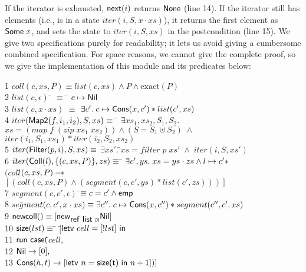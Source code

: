 \documentclass[preprint,natbib]{sigplanconf}
\begin{document}
If the iterator is exhausted, $\mbox{\textsf{{next}}}(i)$ returns $\mbox{\textsf{{None}}}$
(line 14). If the iterator still has elements (i.e., is in a state
$iter(i, S, x\cdot xs)$), it returns the first element as
$\mbox{\textsf{{Some}}}\;x$, and sets the state to $iter(i, S, xs)$ in the
postcondition (line 15). We give two specifications purely for
readability; it lets us avoid giving a cumbersome combined
specification.
%
For space reasons, we cannot give the complete proof, so we give the
implementation of this module and its predicates below:
{\small
\begin{tabbing}
1\qquad \= $coll$\=$(c, xs, P) \equiv list(c, xs) \land P \land \mbox{exact}(P)$ \\[0.5em]
2 \> $list(c, \epsilon)$ \qquad\= $\equiv$ \= $c \mapsto \mbox{\textsf{{Nil}}}$ \\
3 \> $list(c, x\cdot xs)$ \> $\equiv$ \> 
   $\exists c'.\; c \mapsto \mbox{\textsf{{Cons}}}(x, c') * list(c', xs)$ 
\\[0.5em]
4 \> $iter$\=$(\mbox{\textsf{{Map2}}}(f, i_1, i_2), S, xs)$\=$ \equiv$ \= 
         $\exists$\=$xs_1, xs_2, S_1, S_2.$ \\
\> \>\>\>\>$xs = (map\; f\; (zip\; xs_1\; xs_2)) \land (S = S_1 \uplus S_2) \;\land$\\
\> \>\>\>\>$iter(i_1, S_1, xs_1) * iter(i_2, S_2, xs_2)$ \\
5 \> $iter(\mbox{\textsf{{Filter}}}(p, i), S, xs) \equiv$ 
   $\exists xs'.\;$\=$xs = filter\;p\;xs' \;\land\; iter(i, S, xs')$ \\
6 \> $iter(\mbox{\textsf{{Coll}}}(l), \{{(c, xs, P)}\}, zs) \equiv$ \= 
 $\exists$\=$ c', ys.\; xs = ys \cdot zs \land l \mapsto c' * $ \\
\> \> \> $(coll$\=$(c, xs, P) -\!\!*\;$\\ 
\> \> \> \> \!\!\!\!$[(coll(c, xs, P) \land (segment(c, c', ys) * list(c', zs)))]$
\\[0.5em]
7 \> $segment(c, c', \epsilon)$ \qquad\=$\equiv c = c' \land \mathsf{emp}$ \\
8 \> $seg$\=$ment(c, c', x\cdot xs) \equiv \exists c''.\; c \mapsto \mbox{\textsf{{Cons}}}(x, c'') * segment(c'', c', xs)$
\\[0.5em]

9 \> $\mbox{\textsf{{newcoll}}}() \equiv [\mbox{\textsf{{new}}}_{\mbox{\textsf{{ref }}}\mbox{\textsf{{list }}}{\mathbb{N}}} \mbox{\textsf{{Nil}}}]$ 
\\[0.5em]
10 \> $\mbox{\textsf{{size}}}(lst) \equiv$ \=  $[$\=$ \mbox{\textsf{{letv }}}cell = [!lst]\mbox{\textsf{{ in }}}$ \\
11 \> \> \> $\mbox{\textsf{{run }}}{}\mbox{\textsf{{case}}}($\=$cell,$ \\
12 \> \> \> \> $\mbox{\textsf{{Nil}}} \to [0], $ \\
13 \> \> \> \> $\mbox{\textsf{{Cons}}}(h,t) \to [\mbox{\textsf{{letv }}}n = \mbox{\textsf{{size(t)}}}\mbox{\textsf{{ in }}}n + 1])]$ 
\\[0.5em]


\end{tabbing}}
\end{document}

